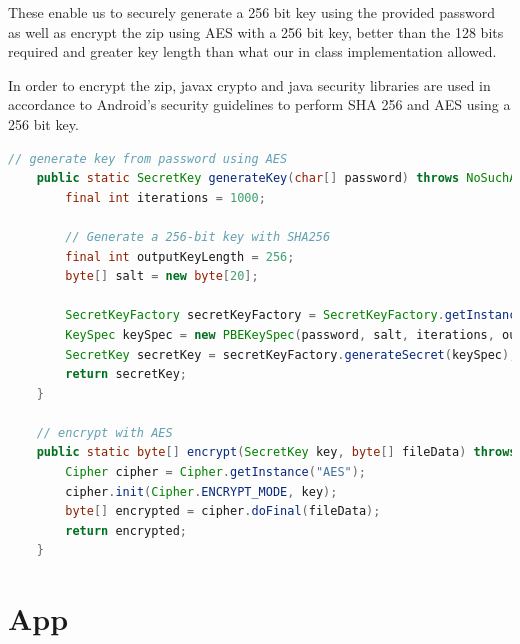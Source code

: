 \documentclass[10pt,a4paper]{article}
\begin{document}
These enable us to securely generate a 256 bit key using the provided password as well as encrypt the zip using AES with a 256 bit key, better than the 128 bits required and greater key length than what our in class implementation allowed.

In order to encrypt the zip, javax crypto and java security libraries are used in accordance to Android's security guidelines to perform SHA 256 and AES using a 256 bit key.
\begin{lstlisting}[language=Java]
// generate key from password using AES
    public static SecretKey generateKey(char[] password) throws NoSuchAlgorithmException, InvalidKeySpecException {
        final int iterations = 1000;

        // Generate a 256-bit key with SHA256
        final int outputKeyLength = 256;
        byte[] salt = new byte[20];

        SecretKeyFactory secretKeyFactory = SecretKeyFactory.getInstance("PBKDF2withHmacSHA256");
        KeySpec keySpec = new PBEKeySpec(password, salt, iterations, outputKeyLength);
        SecretKey secretKey = secretKeyFactory.generateSecret(keySpec);
        return secretKey;
    }

    // encrypt with AES
    public static byte[] encrypt(SecretKey key, byte[] fileData) throws Exception {
        Cipher cipher = Cipher.getInstance("AES");
        cipher.init(Cipher.ENCRYPT_MODE, key);
        byte[] encrypted = cipher.doFinal(fileData);
        return encrypted;
    }

\end{lstlisting}

\clearpage

\section{App}
\end{document}
